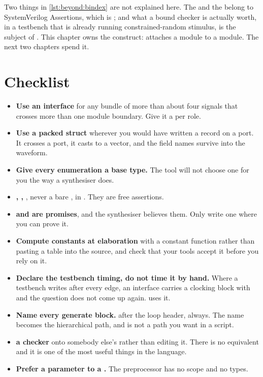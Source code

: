 Two things in \cref{lst:beyond:bindex} are not explained here. The
 and the  belong to SystemVerilog
Assertions, which is ; and what a bound checker is actually
worth, in a testbench that is already running constrained-random stimulus, is
the subject of . This chapter owns the construct: 
attaches a module to a module. The next two chapters spend it.

\section{Checklist}
\label{sec:beyond:checklist}

\begin{itemize}
  \item \textbf{Use an interface} for any bundle of more than about four
        signals that crosses more than one module boundary. Give it a
         per role.
  \item \textbf{Use a packed struct} wherever you would have written a
        \VHDL{} record on a port. It crosses a port, it casts to a vector,
        and the field names survive into the waveform.
  \item \textbf{Give every enumeration a base type.} The tool will not
        choose one for you the way a \VHDL{} synthesiser does.
  \item \textbf{, , },
        never a bare , in \RTL{}. They are free assertions.
  \item \textbf{ and  are promises}, and the
        synthesiser believes them. Only write one where you can prove it.
  \item \textbf{Compute constants at elaboration} with a constant function
        rather than pasting a table into the source, and check that your
        tools accept it before you rely on it.
  \item \textbf{Declare the testbench timing, do not time it by hand.} Where
        a \VHDL{} testbench writes  after every edge, an
        \SV{} interface carries a clocking block with
         and the question does not
        come up again.  uses it.
  \item \textbf{Name every generate block.}  after the loop
        header, always. The name becomes the hierarchical path, and
         is not a path you want in a script.
  \item \textbf{ a checker} onto somebody else{\rq}s \RTL{} rather
        than editing it. There is no \VHDL{} equivalent and it is one of the
        most useful things in the language.
  \item \textbf{Prefer a parameter to a .} The preprocessor has
        no scope and no types.
\end{itemize}
